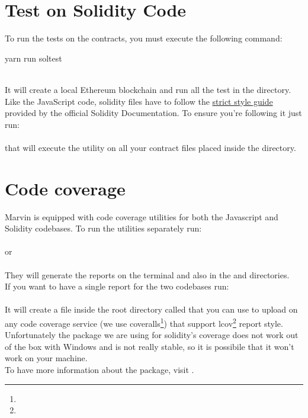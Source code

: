\documentclass[ManualeSviluppatore]{subfiles}
\begin{document}
\section{Test on Solidity Code}
To run the tests on the contracts, you must execute the following command: \\
\begin{ttfamily} yarn run soltest \end{ttfamily} \\
It will create a local Ethereum blockchain and run all the test in the  directory. \\
Like the JavaScript code, solidity files have to follow the \href{https://solidity.readthedocs.io/en/v0.3.1/style-guide.html}{strict style guide} provided by the official Solidity Documentation. To ensure you're following it just run: \\
 \\
that will execute the  utility on all your contract files placed inside the  directory.

\section{Code coverage}
Marvin is equipped with code coverage utilities for both the Javascript and Solidity codebases.
To run the utilities separately run: \\
 \\
or \\
 \\
They will generate the reports on the terminal and also in the  and  directories. \\
If you want to have a single report for the two codebases run: \\
 \\
It will create a file inside the root directory called  that you can use to upload on any code coverage service (we use coveralls\footnote{}) that support lcov\footnote{} report style. \\
Unfortunately the package we are using for solidity's coverage does not work out of the box with Windows and is not really stable, so it is possibile that it won't work on your machine. \\
To have more information about the package, visit .
\end{document}
